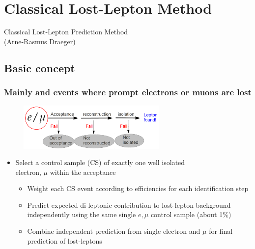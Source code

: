 \documentclass{beamer}
\begin{document}
\section{Classical Lost-Lepton Method}
\begin{frame}
  \begin{center}
    {\Large
     Classical Lost-Lepton Prediction Method \\(Arne-Rasmus Draeger)}
  \end{center}
\end{frame}
\subsection{Basic concept}
\begin{frame}
  \frametitle{Mainly \ttbar and \wpj events where prompt electrons or muons are lost}
   \begin{figure}
 \centering
  \includegraphics[width = 0.65\textwidth]{figures/lepton_veto_sketch.png}
 \end{figure}
      \begin{itemize}
      \item Select a control sample (CS) of exactly one well isolated \\electron, $\mu$ within the acceptance
        \begin{itemize}
        \item Weight each CS event according to efficiencies for each identification step
        \item Predict expected di-leptonic \ttbar contribution to lost-lepton background independently using the same single $e,\mu$ control sample (about 1\%)
        \item Combine independent prediction from single electron and $\mu$ for final prediction of lost-leptons
        \end{itemize}
      \end{itemize}
\end{frame}
\end{document}

